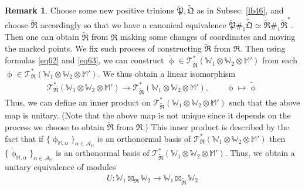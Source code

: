 \documentclass[11pt,b5paper,notitlepage]{article}
\theoremstyle{definition}
\newtheorem{rem}[df]{Remark}
\theoremstyle{plain}
\newcommand{\fk}{\mathfrak}
\newcommand{\mc}{\mathcal}
\newcommand{\wtd}{\widetilde}
\newcommand{\scr}{\mathscr}
\newcommand{\Wbb}{\mathbb W}
\newcommand{\Mbb}{\mathbb M}
\numberwithin{equation}{section}
\begin{document}
\begin{rem}\label{lb57}
Choose some new positive trinions $\wtd{\fk P},\wtd {\fk Q}$ as in Subsec. \ref{lb46}, and choose $\wtd{\fk R}$ accordingly so that we have a canonical equivalence $\wtd{\fk P}\#_1\wtd {\fk Q}\simeq\wtd{\fk R}\#_1\wtd{\fk R}^*$. Then one can obtain  $\wtd{\fk R}$ from $\fk R$ making some changes of coordinates and moving the marked points. We fix such process of constructing $\wtd{\fk R}$ from $\fk R$. Then using formulas \eqref{eq62} and \eqref{eq63}, we can construct $\wtd\upphi\in\scr T_{\wtd{\fk R}}^*(\Wbb_1\otimes\Wbb_2\otimes\Mbb')$ from each $\upphi\in \scr T_{\fk R}^*(\Wbb_1\otimes\Wbb_2\otimes\Mbb')$. We thus obtain a linear isomorphism
\begin{gather*}
\scr T_{\fk R}^*(\Wbb_1\otimes\Wbb_2\otimes\Mbb')\rightarrow \scr T_{\wtd{\fk R}}^*(\Wbb_1\otimes\Wbb_2\otimes\Mbb'),\qquad\upphi\mapsto\wtd\upphi
\end{gather*}
Thus, we can define an inner product on $\scr T_{\wtd{\fk R}}^*(\Wbb_1\otimes\Wbb_2\otimes\Mbb')$ such that the above map is unitary. (Note that the above map is not unique since it depends on the process we choose to obtain $\wtd{\fk R}$ from $\fk R$.) This inner product is described by the fact that if $\{\upphi_{\Mbb,\alpha}\}_{\alpha\in\mc A_\Mbb}$ is an orthonormal basis of $\scr T_{\fk R}^*(\Wbb_1\otimes\Wbb_2\otimes\Mbb')$ then $\{\wtd\upphi_{\Mbb,\alpha}\}_{\alpha\in\mc A_\Mbb}$ is an orthonormal basis of $\scr T_{\wtd{\fk R}}^*(\Wbb_1\otimes\Wbb_2\otimes\Mbb')$. Thus, we obtain a unitary equivalence of modules
\begin{align*}
U:\Wbb_1\boxtimes_{\fk R}\Wbb_2\rightarrow\Wbb_1\boxtimes_{\wtd{\fk R}}\Wbb_2
\end{align*}


\end{rem}
\end{document}
